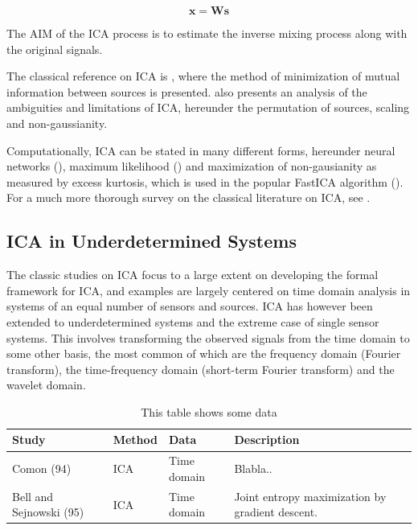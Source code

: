 \documentclass[11pt, oneside, a4paper]{article}
\begin{document}
\begin{equation}
  \mathbf{x} =   \mathbf{W}  \mathbf{s}
\end{equation}

The AIM of the ICA process is to estimate the inverse mixing process
along with the original signals.

The classical reference on ICA
is \cite{comon94}, where the method of minimization of mutual
information between sources is presented. \cite{comon94} also presents an
analysis of the ambiguities and limitations of ICA, hereunder the permutation of
sources, scaling and non-gaussianity. 

Computationally, ICA can be stated in many different forms,
hereunder neural networks (\cite{bellSejnowski95}),
maximum likelihood (\cite{pearlmutterParra}) and maximization of
non-gausianity as measured by excess kurtosis, which is used in the
popular FastICA algorithm (\cite{fastICA}). For a much more thorough survey on the classical literature on ICA, see \cite{hyvarinen2001}.

\subsection{ICA in Underdetermined Systems}
The classic studies on ICA focus to a large extent on developing the
formal framework for ICA, and examples are largely centered on time
domain analysis in systems of an equal number of sensors and
sources. ICA has however been extended to underdetermined systems and
the extreme case of single sensor systems. This involves transforming
the observed signals from the time domain to some other basis, the
most common of which are the frequency domain (Fourier transform), the
time-frequency domain (short-term Fourier transform) and the wavelet domain.


\begin{table}[position specifier]
  \centering
  \begin{tabular}{|l|l|l|p{5cm}|}
    \hline
    \textbf{Study} & \textbf{Method} & \textbf{Data} & \textbf{Description} \\
    \hline
    Comon (94) & ICA & Time domain & Blabla.. \\
    Bell and Sejnowski (95) & ICA & Time domain & Joint entropy
    maximization by gradient descent.\\
    
    \hline
  \end{tabular}
  \caption{This table shows some data}
  \label{tab:myfirsttable}
\end{table}
\end{document}
